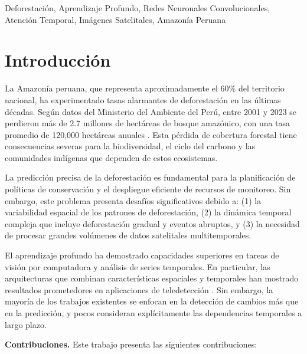 \documentclass[conference]{IEEEtran}
\begin{document}
\begin{IEEEkeywords}
Deforestación, Aprendizaje Profundo, Redes Neuronales Convolucionales, Atención Temporal, Imágenes Satelitales, Amazonía Peruana
\end{IEEEkeywords}

\section{Introducción}

La Amazonía peruana, que representa aproximadamente el 60\% del territorio nacional, ha experimentado tasas alarmantes de deforestación en las últimas décadas. Según datos del Ministerio del Ambiente del Perú, entre 2001 y 2023 se perdieron más de 2.7 millones de hectáreas de bosque amazónico, con una tasa promedio de 120,000 hectáreas anuales \cite{minam2023}. Esta pérdida de cobertura forestal tiene consecuencias severas para la biodiversidad, el ciclo del carbono y las comunidades indígenas que dependen de estos ecosistemas.

La predicción precisa de la deforestación es fundamental para la planificación de políticas de conservación y el despliegue eficiente de recursos de monitoreo. Sin embargo, este problema presenta desafíos significativos debido a: (1) la variabilidad espacial de los patrones de deforestación, (2) la dinámica temporal compleja que incluye deforestación gradual y eventos abruptos, y (3) la necesidad de procesar grandes volúmenes de datos satelitales multitemporales.

El aprendizaje profundo ha demostrado capacidades superiores en tareas de visión por computadora y análisis de series temporales. En particular, las arquitecturas que combinan características espaciales y temporales han mostrado resultados prometedores en aplicaciones de teledetección \cite{reichstein2019deep}. Sin embargo, la mayoría de los trabajos existentes se enfocan en la detección de cambios más que en la predicción, y pocos consideran explícitamente las dependencias temporales a largo plazo.

\textbf{Contribuciones.} Este trabajo presenta las siguientes contribuciones:
\end{document}
